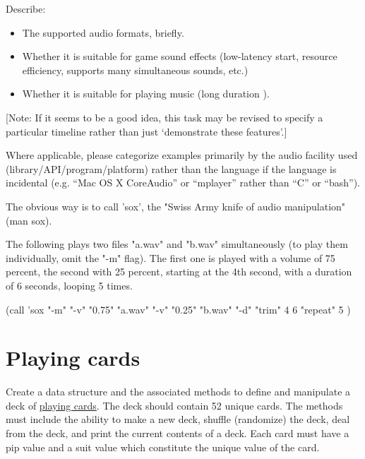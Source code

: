 Describe:

\begin{itemize}
\item
  The supported audio formats, briefly.
\item
  Whether it is suitable for game sound effects (low-latency start,
  resource efficiency, supports many simultaneous sounds, etc.)
\item
  Whether it is suitable for playing music (long duration ).
\end{itemize}

{[}Note: If it seems to be a good idea, this task may be revised to
specify a particular timeline rather than just `demonstrate these
features'.{]}

Where applicable, please categorize examples primarily by the audio
facility used (library/API/program/platform) rather than the language if
the language is incidental (e.g. ``Mac OS X CoreAudio'' or ``mplayer''
rather than ``C'' or ``bash'').



\begin{wideverbatim}

The obvious way is to call 'sox', the "Swiss Army knife of audio manipulation"
(man sox).

The following plays two files "a.wav" and "b.wav" simultaneously (to play them
individually, omit the "-m" flag). The first one is played with a volume of 75
percent, the second with 25 percent, starting at the 4th second, with a duration
of 6 seconds, looping 5 times.

(call 'sox
   "-m"  "-v" "0.75" "a.wav"  "-v" "0.25" "b.wav"
   "-d"
   "trim" 4 6
   "repeat" 5 )

\end{wideverbatim}

\pagebreak{}
\section*{Playing cards}

Create a data structure and the associated methods to define and
manipulate a deck of
\href{http://en.wikipedia.org/wiki/Playing-cards\#Anglo-American-French}{playing
cards}. The deck should contain 52 unique cards. The methods must
include the ability to make a new deck, shuffle (randomize) the deck,
deal from the deck, and print the current contents of a deck. Each card
must have a pip value and a suit value which constitute the unique value
of the card.

